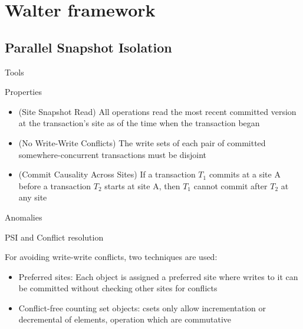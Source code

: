 \documentclass{beamer}
\begin{document}
\section{Walter framework}

	\subsection{Parallel Snapshot Isolation}
		\begin{frame}{Tools}
		
		
		

		\end{frame}
		
		\begin{frame}{Properties}
		
		\begin{itemize}
		
		\item (Site Snapshot Read) All operations read the most recent committed version at the transaction's site as of the time when the transaction began
		\item (No Write-Write Conflicts) The write sets of each pair of committed somewhere-concurrent transactions must be disjoint
		\item (Commit Causality Across Sites) If a transaction $T_{1}$ commits at a site A before a transaction $T_{2}$ starts at site A, then $T_{1}$ cannot commit after $T_{2}$ at any site
		
		\end{itemize}
		
		\end{frame}	

		\begin{frame}{Anomalies}
		
		
		\end{frame}
		
		\begin{frame}{PSI and Conflict resolution}
		
		For avoiding write-write conflicts, two techniques are used:
		
		\begin{itemize}
		
		\item Preferred sites: Each object is assigned a preferred site where writes to it can be committed without checking other sites for conflicts
		\item Conflict-free counting set objects: csets only allow incrementation or decremental of elements, operation which are commutative  
		
		\end{itemize}
		
		\end{frame}
		
\end{document}
